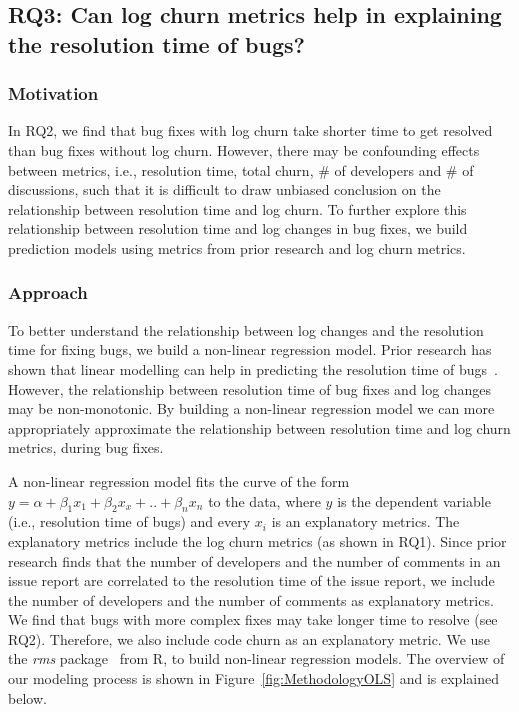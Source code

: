 \subsection*{RQ3: Can log churn metrics help in explaining the resolution time of bugs?} 

\subsubsection*{Motivation}

In RQ2, we find that bug fixes with log churn take shorter time to get resolved than bug fixes without log churn. However, there may be confounding effects between metrics, i.e., resolution time, total churn, \# of developers and \# of discussions, such that it is difficult to draw unbiased conclusion on the relationship between resolution time and log churn. To further explore this relationship between resolution time and log changes in bug fixes, we build prediction models using metrics from prior research and log churn metrics. %

\subsubsection*{Approach}

To better understand the relationship between log changes and the resolution time for fixing bugs, we build a non-linear regression model. Prior research has shown that linear modelling can help in predicting the resolution time of bugs~\cite{anbalagan2009predicting}. However, the relationship between resolution time of bug fixes and log changes may be non-monotonic. By building a non-linear regression model we can more appropriately approximate the relationship between resolution time and log churn metrics, during bug fixes.

A non-linear regression model fits the curve of the form $y = \alpha + \beta_{1}x_{1} + \beta_{2}x_{x} + .. + \beta_{n}x_{n} $ to the data, where $y$ is the dependent variable (i.e., resolution time of bugs) and every $x_{i}$ is an explanatory metrics. The explanatory metrics include the log churn metrics (as shown in RQ1). Since prior research finds that the number of developers and the number of comments in an issue report are correlated to the resolution time of the issue report, we include the number of developers and the number of comments as explanatory metrics. We find that bugs with more complex fixes may take longer time to resolve (see RQ2). Therefore, we also include code churn as an explanatory metric. We use the \textsl{rms} package~\cite{rmsPackage} from R, to build non-linear regression models. The overview of our modeling process is shown in Figure~\ref{fig:MethodologyOLS} and is explained below. 




